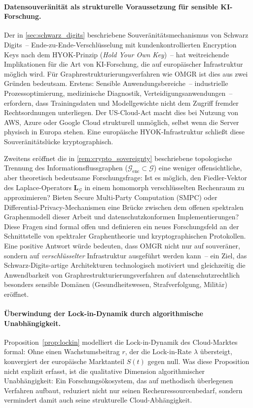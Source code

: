 ﻿\documentclass[12pt, a4paper, openany]{report}
\newcommand{\calG}{\mathcal{G}}
\begin{document}
\paragraph{Datensouveränität als strukturelle Voraussetzung für
  sensible KI-Forschung.}
Der in \cref{sec:schwarz_digits} beschriebene Souveränitätsmechanismus
von Schwarz Digits~-- Ende-zu-Ende-Verschlüsselung mit
kundenkontrollierten Encryption Keys nach dem HYOK-Prinzip
(\textit{Hold Your Own Key})~-- hat weitreichende Implikationen für die
Art von KI-Forschung, die auf europäischer Infrastruktur möglich wird.
Für Graphrestrukturierungsverfahren wie OMGR ist dies aus zwei Gründen
bedeutsam.  Erstens: Sensible Anwendungsbereiche~-- industrielle
Prozessoptimierung, medizinische Diagnostik,
Verteidigungsanwendungen~-- erfordern, dass Trainingsdaten und
Modellgewichte nicht dem Zugriff fremder Rechtsordnungen unterliegen.
Der US-Cloud-Act macht dies bei Nutzung von AWS, Azure oder Google
Cloud strukturell unmöglich, selbst wenn die Server physisch in Europa
stehen.  Eine europäische HYOK-Infrastruktur schließt diese
Souveränitätslücke kryptographisch.

Zweitens eröffnet die in \cref{rem:crypto_sovereignty} beschriebene
topologische Trennung des Informationsflussgraphen
($\calG_{\mathrm{enc}} \subset \calG$) eine weniger offensichtliche,
aber theoretisch bedeutsame Forschungsfrage: Ist es möglich, den
Fiedler-Vektor des Laplace-Operators $\bm{L}_{\calG}$ in einem
homomorph verschlüsselten Rechenraum zu approximieren?  Bieten Secure
Multi-Party Computation (SMPC) oder Differential-Privacy-Mechanismen
eine Brücke zwischen dem offenen spektralen Graphenmodell dieser Arbeit
und datenschutzkonformen Implementierungen?  Diese Fragen sind formal
offen und definieren ein neues Forschungsfeld an der Schnittstelle von
spektraler Graphentheorie und kryptographischen Protokollen.  Eine
positive Antwort würde bedeuten, dass OMGR nicht nur auf souveräner,
sondern auf \emph{verschlüsselter} Infrastruktur ausgeführt werden
kann~-- ein Ziel, das Schwarz-Digits-artige Architekturen technologisch
motiviert und gleichzeitig die Anwendbarkeit von
Graphrestrukturierungsverfahren auf datenschutzrechtlich besonders
sensible Domänen (Gesundheitswesen, Strafverfolgung, Militär) eröffnet.

\paragraph{Überwindung der Lock-in-Dynamik durch algorithmische
  Unabhängigkeit.}
Proposition~\ref{prop:lockin} modelliert die Lock-in-Dynamik des
Cloud-Marktes formal: Ohne einen Wachstumsbeitrag $r$, der die
Lock-in-Rate $\lambda$ übersteigt, konvergiert der europäische
Marktanteil $S(t)$ gegen null.  Was diese Proposition nicht explizit
erfasst, ist die qualitative Dimension algorithmischer Unabhängigkeit:
Ein Forschungsökosystem, das auf methodisch überlegenen Verfahren
aufbaut, reduziert nicht nur seinen Rechenressourcenbedarf, sondern
vermindert damit auch seine strukturelle Cloud-Abhängigkeit.
\end{document}
